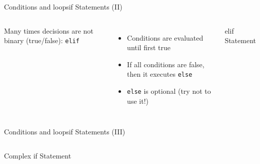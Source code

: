 \documentclass[10pt,compress]{beamer} %
\begin{document}
\begin{frame}{Conditions and loops}{if Statements (II)}
    \begin{columns}
	Many times decisions are not binary (true/false): \texttt{elif}
		\begin{itemize}
		\item Conditions are evaluated until first true
		\item If all conditions are false, then it executes \texttt{else}
		\item \texttt{else} is optional (try not to use it!)
		\end{itemize}

		\begin{block}{elif Statement}
		\vspace{-0.2cm}
		
		\vspace{-0.3cm}
		\end{block}
	\end{columns}
\end{frame}

\begin{frame}{Conditions and loops}{if Statements (III)}
    \begin{columns}
		\begin{block}{Complex if Statement}
		\vspace{-0.2cm}
		
		\vspace{-0.3cm}
		\end{block}
	\end{columns}
\end{frame}
\end{document}
